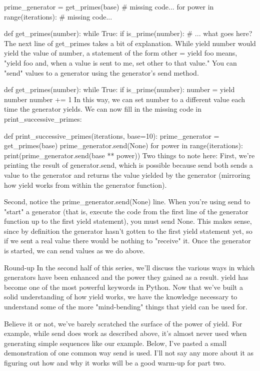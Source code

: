     prime_generator = get_primes(base)
    # missing code...
    for power in range(iterations):
        # missing code...

def get_primes(number):
    while True:
        if is_prime(number):
        # ... what goes here?
The next line of get_primes takes a bit of explanation. While yield number would yield the value of number, a statement of the form other = yield foo means, "yield foo and, when a value is sent to me, set other to that value." You can "send" values to a generator using the generator's send method.

def get_primes(number):
    while True:
        if is_prime(number):
            number = yield number
        number += 1
In this way, we can set number to a different value each time the generator yields. We can now fill in the missing code in print_successive_primes:

def print_successive_primes(iterations, base=10):
    prime_generator = get_primes(base)
    prime_generator.send(None)
    for power in range(iterations):
        print(prime_generator.send(base ** power))
Two things to note here: First, we're printing the result of generator.send, which is possible because send both sends a value to the generator and returns the value yielded by the generator (mirroring how yield works from within the generator function).

Second, notice the prime_generator.send(None) line. When you're using send to "start" a generator (that is, execute the code from the first line of the generator function up to the first yield statement), you must send None. This makes sense, since by definition the generator hasn't gotten to the first yield statement yet, so if we sent a real value there would be nothing to "receive" it. Once the generator is started, we can send values as we do above.

Round-up
In the second half of this series, we'll discuss the various ways in which generators have been enhanced and the power they gained as a result. yield has become one of the most powerful keywords in Python. Now that we've built a solid understanding of how yield works, we have the knowledge necessary to understand some of the more "mind-bending" things that yield can be used for.

Believe it or not, we've barely scratched the surface of the power of yield. For example, while send does work as described above, it's almost never used when generating simple sequences like our example. Below, I've pasted a small demonstration of one common way send is used. I'll not say any more about it as figuring out how and why it works will be a good warm-up for part two.

